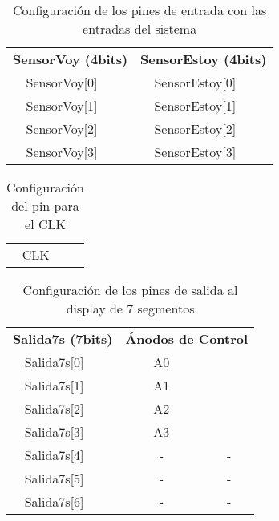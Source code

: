

	\begin{table}[H]
    \centering
		\begin{tabular}{|c|c||c|c|}
			\hline
			\rowcolor[rgb]{0.21,0.69,0.87}\multicolumn{4}{|c|}{  \textbf{ {Configuración Pines de entrada}}} \\
			\hline \hline
			\multicolumn{2}{|c|}{  \textbf{ {SensorVoy (4bits)}}} & \multicolumn{2}{|c|}{\textbf{SensorEstoy (4bits)}} \\
			\hline
			SensorVoy[0] & & SensorEstoy[0] & \\
			SensorVoy[1] & & SensorEstoy[1] & \\
			SensorVoy[2] & & SensorEstoy[2] & \\
			SensorVoy[3] & & SensorEstoy[3] & \\
			\hline
		\end{tabular}
		\caption{ Configuración de los pines de entrada con las entradas del sistema }
		\label{tab:pinEntradas}
	\end{table}

	\begin{table}[H]
    \centering
		\begin{tabular}{|c|c|}
			\hline
			\rowcolor[rgb]{0.21,0.69,0.87}\multicolumn{2}{|c|}{  \textbf{ {Configuración pin CLK}}} \\
			\hline \hline
			CLK & \\ 
			\hline
		\end{tabular}
		\caption{ Configuración del pin para el CLK }
		\label{tab:pinCLK}
	\end{table}

	\begin{table}[H]
    \centering
		\begin{tabular}{|c|c||c|c|}
			\hline
			\rowcolor[rgb]{0.21,0.69,0.87}\multicolumn{4}{|c|}{  \textbf{ {Configuración Pines de los displays de 7 segmentos}}} \\
			\hline \hline
			\multicolumn{2}{|c|}{  \textbf{ { Salida7s (7bits)}}} & \multicolumn{2}{|c|}{\textbf{Ánodos de Control}} \\
			\hline
			Salida7s[0] & & A0 & \\
			Salida7s[1] & & A1 & \\
			Salida7s[2] & & A2 & \\
			Salida7s[3] & & A3 & \\
			Salida7s[4] & & - & - \\
			Salida7s[5] & & - & - \\
			Salida7s[6] & & - & - \\
			\hline
		\end{tabular}
		\caption{ Configuración de los pines de salida al display de 7 segmentos }
		\label{tab:pin7s}
	\end{table}
